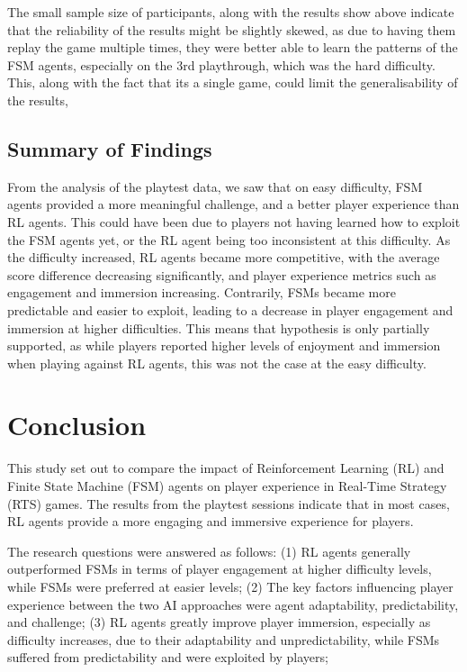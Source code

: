 \documentclass[conference]{IEEEtran}
\begin{document}
The small sample size of participants, along with the results show above indicate that the reliability of the results might be slightly skewed,
as due to having them replay the game multiple times, they were better able to learn the patterns of the FSM agents, especially on the 3rd playthrough,
which was the hard difficulty. This, along with the fact that its a single game, could limit the generalisability of the results,

\subsection{Summary of Findings}
From the analysis of the playtest data, we saw that on easy difficulty, FSM agents provided a more meaningful challenge, and a better player experience than RL agents.
This could have been due to players not having learned how to exploit the FSM agents yet, or the RL agent being too inconsistent at this difficulty.
As the difficulty increased, RL agents became more competitive, with the average score difference decreasing significantly, and player experience metrics such as engagement and immersion increasing.
Contrarily, FSMs became more predictable and easier to exploit, leading to a decrease in player engagement and immersion at higher difficulties.
This means that hypothesis is only partially supported, as while players reported higher levels of enjoyment and immersion when playing against RL agents, this was not the case at the easy difficulty.

\section{Conclusion}

This study set out to compare the impact of Reinforcement Learning (RL) and Finite State Machine (FSM) agents on player experience in Real-Time Strategy (RTS) games.
The results from the playtest sessions indicate that in most cases, RL agents provide a more engaging and immersive experience for players.

The research questions were answered as follows: 
(1) RL agents generally outperformed FSMs in terms of player engagement at higher difficulty levels, while FSMs were preferred at easier levels; 
(2) The key factors influencing player experience between the two AI approaches were agent adaptability, predictability, and challenge;
(3) RL agents greatly improve player immersion, especially as difficulty increases, due to their adaptability and unpredictability, while FSMs suffered from predictability and were exploited by players;
\end{document}
